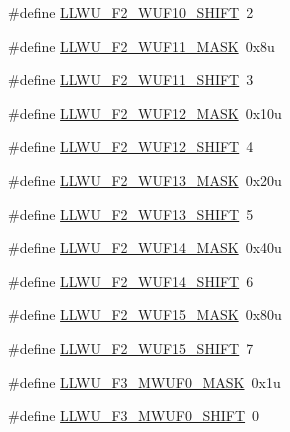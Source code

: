 \begin{DoxyCompactItemize}
\item 
\#define \hyperlink{group___l_l_w_u___register___masks_ga0ac579128aa08740377c46fd52be2bb5}{L\+L\+W\+U\+\_\+\+F2\+\_\+\+W\+U\+F10\+\_\+\+S\+H\+I\+FT}~2
\item 
\#define \hyperlink{group___l_l_w_u___register___masks_ga618834480f34a7997f2f4fab80d87400}{L\+L\+W\+U\+\_\+\+F2\+\_\+\+W\+U\+F11\+\_\+\+M\+A\+SK}~0x8u
\item 
\#define \hyperlink{group___l_l_w_u___register___masks_ga37c17efe2e5332ad92f9a05d9a15a2f2}{L\+L\+W\+U\+\_\+\+F2\+\_\+\+W\+U\+F11\+\_\+\+S\+H\+I\+FT}~3
\item 
\#define \hyperlink{group___l_l_w_u___register___masks_ga59dfa340c96f0c04fe3667e00dfb0575}{L\+L\+W\+U\+\_\+\+F2\+\_\+\+W\+U\+F12\+\_\+\+M\+A\+SK}~0x10u
\item 
\#define \hyperlink{group___l_l_w_u___register___masks_gae04234ed612320f80fe119820ae78e39}{L\+L\+W\+U\+\_\+\+F2\+\_\+\+W\+U\+F12\+\_\+\+S\+H\+I\+FT}~4
\item 
\#define \hyperlink{group___l_l_w_u___register___masks_ga6618b24b83e2e28d9268c1f5fac431af}{L\+L\+W\+U\+\_\+\+F2\+\_\+\+W\+U\+F13\+\_\+\+M\+A\+SK}~0x20u
\item 
\#define \hyperlink{group___l_l_w_u___register___masks_ga6c8e71714d1a4c5e9b8dddb08d41679e}{L\+L\+W\+U\+\_\+\+F2\+\_\+\+W\+U\+F13\+\_\+\+S\+H\+I\+FT}~5
\item 
\#define \hyperlink{group___l_l_w_u___register___masks_ga5f6f604b22d249edf1101cd9aa087072}{L\+L\+W\+U\+\_\+\+F2\+\_\+\+W\+U\+F14\+\_\+\+M\+A\+SK}~0x40u
\item 
\#define \hyperlink{group___l_l_w_u___register___masks_ga775751b74c858d4adf406ff063630bbf}{L\+L\+W\+U\+\_\+\+F2\+\_\+\+W\+U\+F14\+\_\+\+S\+H\+I\+FT}~6
\item 
\#define \hyperlink{group___l_l_w_u___register___masks_gaa56b2f78b177bd14e66b3863dbb14625}{L\+L\+W\+U\+\_\+\+F2\+\_\+\+W\+U\+F15\+\_\+\+M\+A\+SK}~0x80u
\item 
\#define \hyperlink{group___l_l_w_u___register___masks_gaae1c32b7e20bbc817c4c5af4479e2a91}{L\+L\+W\+U\+\_\+\+F2\+\_\+\+W\+U\+F15\+\_\+\+S\+H\+I\+FT}~7
\item 
\#define \hyperlink{group___l_l_w_u___register___masks_ga1bb6bf136de15f4cc67eee67d53361a9}{L\+L\+W\+U\+\_\+\+F3\+\_\+\+M\+W\+U\+F0\+\_\+\+M\+A\+SK}~0x1u
\item 
\#define \hyperlink{group___l_l_w_u___register___masks_ga3b2c7982efa30073491d05e0dbc698e8}{L\+L\+W\+U\+\_\+\+F3\+\_\+\+M\+W\+U\+F0\+\_\+\+S\+H\+I\+FT}~0
\item 

\end{DoxyCompactItemize}
